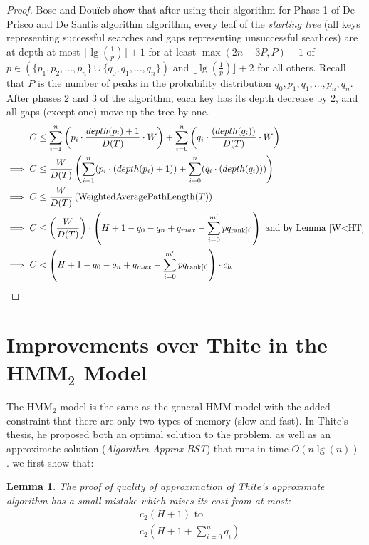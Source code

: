 \documentclass[letterpaper,12pt,titlepage,oneside,final]{book}
\theoremstyle{plain}
\newtheorem{lem}[thm]{Lemma}
\begin{document}
\begin{proof}

Bose and Dou\"{i}eb show that after using their algorithm for Phase 1 of De Prisco and De Santis algorithm algorithm, every leaf of the \textit{starting tree} (all keys representing successful searches and gaps representing unsuccessful searhces) are at depth at most $\lfloor \lg(\frac{1}{p}) \rfloor + 1$  for at least $\max(2n-3P,P)-1$ of $p \in \left( \{p_1, p_2, ..., p_n \} \cup \{ q_0, q_1, ..., q_n \} \right)$ and $\lfloor \lg(\frac{1}{p}) \rfloor + 2$ for all others. Recall that $P$ is the number of peaks in the probability distribution $q_0, p_1, q_1, ..., p_n, q_n$. After phases 2 and 3 of the algorithm, each key has its depth decrease by 2, and all gaps (except one) move up the tree by one.
\begin{align*}
C &\leq \sum_{i=1}^{n} \left(p_i\cdot \frac{depth(p_i)+1}{D(T)}\cdot  W \right)+ \sum_{i=0}^{n} \left(q_i\cdot \frac{(depth(q_i))}{D(T)}\cdot  W \right) \\
\implies C &\leq \frac{W}{D(T)} \left(\sum_{i=1}^{n}(p_i\cdot (depth(p_i)+1))+ \sum_{i=0}^{n}(q_i\cdot (depth(q_i))) \right) \\
\implies C &\leq \frac{W}{D(T)} \left(\text{WeightedAveragePathLength}(T) \right) \\
\implies C &\leq  \left( \frac{W}{D(T)} \right) \cdot  \left(H + 1 - q_0 - q_n + q_{max} - \sum_{i=0}^{m'} pq_{\text{rank}[i]} \right) \text{ and by Lemma~\ref{W<HT}} \\
\implies C &<  \left(H + 1 - q_0 - q_n + q_{max} - \sum_{i=0}^{m'} pq_{\text{rank}[i]} \right)\cdot c_h
\end{align*}

\end{proof}


\section{Improvements over Thite in the HMM$_2$ Model}

The HMM$_2$ model is the same as the general HMM model with the added constraint that there are only two types of memory (slow and fast). In Thite's thesis, he proposed both an optimal solution to the problem, as well as an approximate solution (\textit{Algorithm Approx-BST}) that runs in time $O(n \lg(n))$ \cite{thite2008optimum}. we first show that:
\begin{lem}
The proof of quality of approximation of Thite's approximate algorithm has a small mistake which raises its cost from at most: 
\begin{align*}
&c_2(H+1) \text{ to} \\
&c_2(H+1+\sum_{i=0}^{n}q_i)
\end{align*}
\end{lem}
\end{document}

